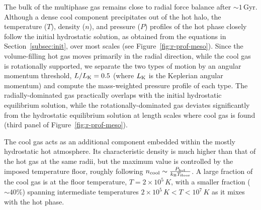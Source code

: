 The bulk of the multiphase gas remains close to radial force balance after $\sim 1$\,Gyr.
Although a dense cool component precipitates out of the hot halo, the temperature ($T$), density ($n$), and pressure ($P$) profiles of the hot phase closely follow the initial hydrostatic solution, as obtained from the equations in Section~\ref{subsec:init}, over most scales (see Figure~\ref{fig:r-prof-meso}).
Since the volume-filling hot gas moves primarily in the radial direction, while the cool gas is rotationally supported, we separate the two types of motion by an angular momentum threshold, $L/L_{\rm K} = 0.5$ (where $L_{\rm K}$ is the Keplerian angular momentum) and compute the mass-weighted pressure profile of each type.
The radially-dominated gas practically overlaps with the initial hydrostatic equilibrium solution, while the rotationally-dominated gas deviates significantly from the hydrostatic equilibrium solution at length scales where cool gas is found (third panel of Figure~\ref{fig:r-prof-meso}).


The cool gas acts as an additional component embedded within the mostly hydrostatic hot atmosphere.
Its characteristic density is much higher than that of the hot gas at the same radii, but the maximum value is controlled by the imposed temperature floor, roughly following $n_{\rm cool} \sim \frac{P_{\rm hot}}{k_{\rm B}T_{\rm floor}}$.
A large fraction of the cool gas is at the floor temperature, $T =2\times10^5\,K$, with a smaller fraction ($\sim 40\%$) spanning intermediate temperatures $2\times10^5\,K < T < 10^7\,K$ as it mixes with the hot phase.


